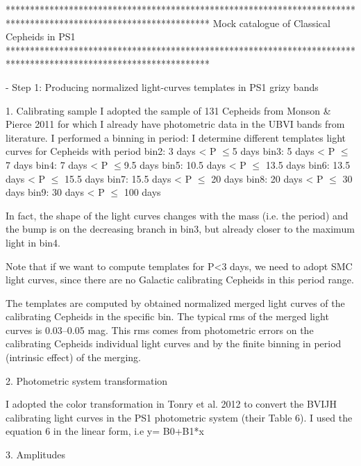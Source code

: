 ******************************************************************************************************************
Mock catalogue of Classical Cepheids in PS1
******************************************************************************************************************

- Step 1: Producing normalized light-curves templates in PS1 grizy bands

        1. Calibrating sample
            I adopted the sample of 131 Cepheids from Monson \& Pierce 2011 for which I already have photometric data
            in the UBVI bands from literature.
            I performed a binning in period: I determine different templates light curves
            for Cepheids with period
            bin2:  3 days < P $\leqslant$5 days 
            bin3:  5 days < P $\leqslant$7 days 
            bin4:  7 days < P $\leqslant$9.5 days
	    bin5:  10.5 days < P $\leqslant$ 13.5 days
	    bin6:  13.5 days < P $\leqslant$ 15.5 days
	    bin7:  15.5 days < P $\leqslant$ 20 days
	    bin8:  20 days < P $\leqslant$ 30  days
	    bin9:  30 days < P $\leqslant$ 100 days
            
            In fact, the shape of the light curves changes with the mass (i.e. the period) 
            and the bump is on the decreasing branch in bin3, but already
            closer to the maximum light in bin4.
            
            Note that if we want to compute templates for P<3 days,
            we need to adopt SMC light curves, since there are no Galactic
            calibrating Cepheids in this period range.
            
            The templates are computed by obtained normalized merged light curves
            of the calibrating Cepheids in the specific bin.
            The typical rms of the merged light curves is 0.03--0.05 mag.
            This rms comes from photometric errors on the 
            calibrating Cepheids individual light curves and by the finite binning in period
            (intrinsic effect) of the merging.
            
        2. Photometric system transformation
        
            I adopted the color transformation in Tonry et al. 2012 to convert the 
            BVIJH calibrating light curves in the PS1 photometric system (their Table 6).
            I used the equation 6 in the linear form, i.e y= B0+B1*x
        
        
        3. Amplitudes
        
